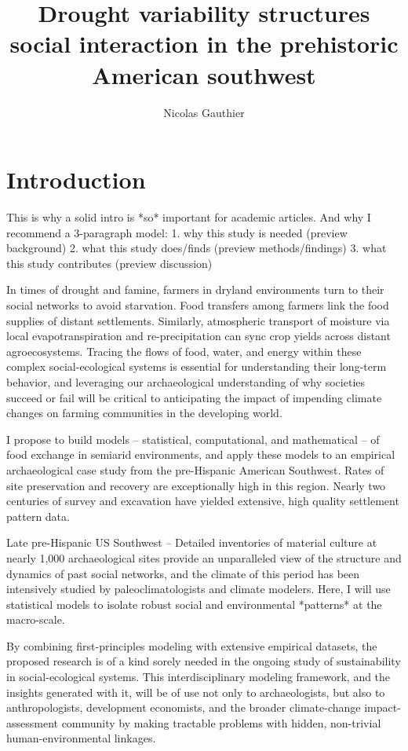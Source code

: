 \documentclass[fleqn,10pt]{wlscirep}
\title{Drought variability structures social interaction in the prehistoric American southwest}
\author[1,*]{Nicolas Gauthier}
\affil[1]{School of Human Evolution and Social Change, 900 S Caddy Mall, Tempe, USA}
\affil[*]{Nicolas.Gauthier@asu.edu}
\begin{document}
\flushbottom
\maketitle


\thispagestyle{empty}


\section*{Introduction}

This is why a solid intro is *so* important for academic articles. And why I recommend a 3-paragraph model:
1. why this study is needed (preview background)
2. what this study does/finds (preview methods/findings)
3. what this study contributes (preview discussion)

In times of drought and famine, farmers in dryland environments turn to their social networks to avoid starvation. Food transfers among farmers link the food supplies of distant settlements. Similarly, atmospheric transport of moisture via local evapotranspiration and re-precipitation can sync crop yields across distant agroecosystems. Tracing the flows of food, water, and energy within these complex social-ecological systems is essential for understanding their long-term behavior, and leveraging our archaeological understanding of why societies succeed or fail will be critical to anticipating the impact of impending climate changes on farming communities in the developing world.

I propose to build models -- statistical, computational, and mathematical -- of food exchange in semiarid environments, and apply these models to an empirical archaeological case study from the pre-Hispanic American Southwest. Rates of site preservation and recovery are exceptionally high in this region. Nearly two centuries of survey and excavation have yielded extensive, high quality settlement pattern data.


   Late pre-Hispanic US Southwest -- Detailed inventories of material culture at nearly 1,000 archaeological sites provide an unparalleled view of the structure and dynamics of past social networks, and the climate of this period has been intensively studied by paleoclimatologists and climate modelers. Here, I will use statistical models to isolate robust social and environmental *patterns* at the macro-scale.


By combining first-principles modeling with extensive empirical datasets, the proposed research is of a kind sorely needed in the ongoing study of sustainability in social-ecological systems. This interdisciplinary modeling framework, and the insights generated with it, will be of use not only to archaeologists, but also to anthropologists, development economists, and the broader climate-change impact-assessment community by making tractable problems with hidden, non-trivial human-environmental linkages.
\end{document}
